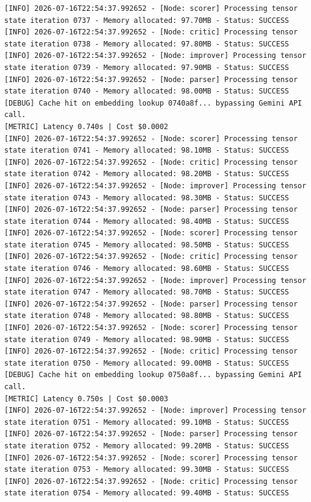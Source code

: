 \documentclass[10pt,journal,compsoc]{IEEEtran}
\begin{document}
\begin{verbatim}
[INFO] 2026-07-16T22:54:37.992652 - [Node: scorer] Processing tensor state iteration 0737 - Memory allocated: 97.70MB - Status: SUCCESS
[INFO] 2026-07-16T22:54:37.992652 - [Node: critic] Processing tensor state iteration 0738 - Memory allocated: 97.80MB - Status: SUCCESS
[INFO] 2026-07-16T22:54:37.992652 - [Node: improver] Processing tensor state iteration 0739 - Memory allocated: 97.90MB - Status: SUCCESS
[INFO] 2026-07-16T22:54:37.992652 - [Node: parser] Processing tensor state iteration 0740 - Memory allocated: 98.00MB - Status: SUCCESS
[DEBUG] Cache hit on embedding lookup 0740a8f... bypassing Gemini API call.
[METRIC] Latency 0.740s | Cost $0.0002
[INFO] 2026-07-16T22:54:37.992652 - [Node: scorer] Processing tensor state iteration 0741 - Memory allocated: 98.10MB - Status: SUCCESS
[INFO] 2026-07-16T22:54:37.992652 - [Node: critic] Processing tensor state iteration 0742 - Memory allocated: 98.20MB - Status: SUCCESS
[INFO] 2026-07-16T22:54:37.992652 - [Node: improver] Processing tensor state iteration 0743 - Memory allocated: 98.30MB - Status: SUCCESS
[INFO] 2026-07-16T22:54:37.992652 - [Node: parser] Processing tensor state iteration 0744 - Memory allocated: 98.40MB - Status: SUCCESS
[INFO] 2026-07-16T22:54:37.992652 - [Node: scorer] Processing tensor state iteration 0745 - Memory allocated: 98.50MB - Status: SUCCESS
[INFO] 2026-07-16T22:54:37.992652 - [Node: critic] Processing tensor state iteration 0746 - Memory allocated: 98.60MB - Status: SUCCESS
[INFO] 2026-07-16T22:54:37.992652 - [Node: improver] Processing tensor state iteration 0747 - Memory allocated: 98.70MB - Status: SUCCESS
[INFO] 2026-07-16T22:54:37.992652 - [Node: parser] Processing tensor state iteration 0748 - Memory allocated: 98.80MB - Status: SUCCESS
[INFO] 2026-07-16T22:54:37.992652 - [Node: scorer] Processing tensor state iteration 0749 - Memory allocated: 98.90MB - Status: SUCCESS
[INFO] 2026-07-16T22:54:37.992652 - [Node: critic] Processing tensor state iteration 0750 - Memory allocated: 99.00MB - Status: SUCCESS
[DEBUG] Cache hit on embedding lookup 0750a8f... bypassing Gemini API call.
[METRIC] Latency 0.750s | Cost $0.0003
[INFO] 2026-07-16T22:54:37.992652 - [Node: improver] Processing tensor state iteration 0751 - Memory allocated: 99.10MB - Status: SUCCESS
[INFO] 2026-07-16T22:54:37.992652 - [Node: parser] Processing tensor state iteration 0752 - Memory allocated: 99.20MB - Status: SUCCESS
[INFO] 2026-07-16T22:54:37.992652 - [Node: scorer] Processing tensor state iteration 0753 - Memory allocated: 99.30MB - Status: SUCCESS
[INFO] 2026-07-16T22:54:37.992652 - [Node: critic] Processing tensor state iteration 0754 - Memory allocated: 99.40MB - Status: SUCCESS

\end{verbatim}
\end{document}
